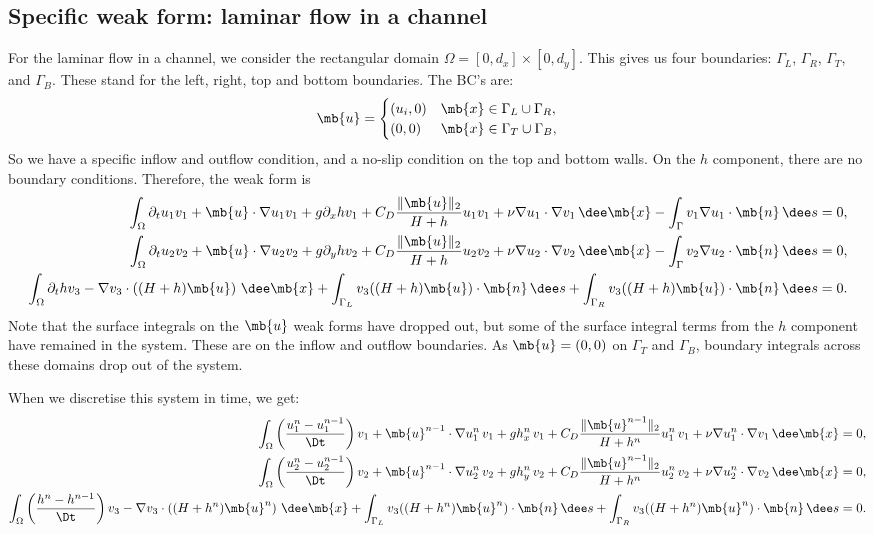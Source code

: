 \documentclass[11pt]{article}
\begin{document}
\subsection*{Specific weak form: laminar flow in a channel}

For the laminar flow in a channel, we consider the rectangular domain $\Omega =
[0, d_x] \times [0, d_y]$. This gives us four boundaries: $\Gamma_L$,
$\Gamma_R$, $\Gamma_T$, and $\Gamma_B$. These stand for the left, right, top and
bottom boundaries. The BC's are:
\[
  \mb{u} =
  \begin{cases}
    (u_i, 0) & \mb{x} \in \Gamma_L \cup \Gamma_R, \\
    (0, 0) & \mb{x} \in \Gamma_T \cup \Gamma_B,
  \end{cases}
\]
So we have a specific inflow and outflow condition, and a no-slip condition on
the top and bottom walls. On the $h$ component, there are no boundary
conditions. Therefore, the weak form is
\begin{align*}
  \int_\Omega
  \partial_t u_1 v_1 +  \mb{u} \cdot \nabla u_1 v_1 +  g \partial_x h v_1
  + C_D \frac{\lVert \mb{u} \rVert_2}{H + h} u_1 v_1
  + \nu \nabla u_1 \cdot \nabla v_1 \, \dee \mb{x}
  - \int_\Gamma v_1 \nabla u_1 \cdot \mb{n} \, \dee s &= 0, \\
  \int_\Omega \partial_t u_2 v_2 +  \mb{u} \cdot \nabla u_2 v_2 +  g \partial_y h v_2
  + C_D \frac{\lVert \mb{u} \rVert_2}{H + h} u_2 v_2
  + \nu \nabla u_2 \cdot \nabla v_2 \, \dee \mb{x}
  - \int_\Gamma v_2 \nabla u_2 \cdot \mb{n} \, \dee s &= 0, \\
  \int_\Omega \partial_t h v_3
  - \nabla v_3 \cdot \left( (H + h) \mb{u} \right) \, \dee \mb{x}
  + \int_{\Gamma_L} v_3 ((H + h) \mb{u}) \cdot \mb{n} \, \dee s
  + \int_{\Gamma_R} v_3 ((H + h) \mb{u}) \cdot \mb{n} \, \dee s &= 0.
\end{align*}
Note that the surface integrals on the $\mb{u}$ weak forms have dropped out, but
some of the surface integral terms from the $h$ component have remained in the
system. These are on the inflow and outflow boundaries. As $\mb{u} = (0, 0)$ on
$\Gamma_T$ and $\Gamma_B$, boundary integrals across these domains drop out of
the system.

When we discretise this system in time, we get:
\begin{align*}
  \int_\Omega
  \left(\frac{ u_1^n - u_1^{n - 1}}{\Dt} \right) v_1
  + \mb{u}^{n - 1} \cdot \nabla u_1^n \, v_1
  + g h_x^n \, v_1
  + C_D \frac{\lVert \mb{u}^{n - 1} \rVert_2}{H + h^n} u_1^n \, v_1
  + \nu \nabla u_1^n \cdot \nabla v_1 \, \dee \mb{x} &= 0, \\
  \int_\Omega \left( \frac{u_2^n - u_2^{n - 1}}{\Dt} \right) v_2
  + \mb{u}^{n - 1} \cdot \nabla u_2^n \, v_2
  + g h_y^n \, v_2
  + C_D \frac{\lVert \mb{u}^{n - 1} \rVert_2}{H + h^n} u_2^n \, v_2
  + \nu \nabla u_2^n \cdot \nabla v_2 \, \dee \mb{x} &= 0, \\
  \int_\Omega \left( \frac{h^n - h^{n - 1}}{\Dt} \right) v_3
  - \nabla v_3 \cdot \left( (H + h^n) \mb{u}^n \right) \, \dee \mb{x}
  + \int_{\Gamma_L} v_3 ((H + h^n) \mb{u}^n) \cdot \mb{n} \, \dee s
  + \int_{\Gamma_R} v_3 ((H + h^n) \mb{u}^n) \cdot \mb{n} \, \dee s &= 0.
\end{align*}
\end{document}
